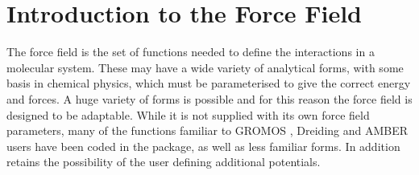 \section{Introduction to the \D Force Field}

The force field is the set of functions needed
to define the interactions in a molecular system.  These may have
a wide variety of analytical forms, with some basis in chemical
physics, which must be parameterised to give the correct energy
and forces.  A huge variety of forms is possible and for this
reason the \D force field is designed
to be adaptable.  While it is not supplied with its own force
field parameters, many of the functions
familiar to GROMOS 
\cite{gunsteren-87a}, Dreiding  \cite{mayo-90a} and AMBER
 \cite{weiner-86a} users have been coded
in the package, as well as less familiar forms.  In addition \D
retains the possibility of the user defining additional
potentials.

